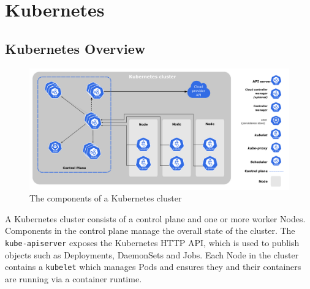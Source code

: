 \section{Kubernetes}

\subsection{Kubernetes Overview}

\begin{figure}[ht]
    \centering
    \includegraphics[width=\textwidth]{images/components-of-kubernetes.pdf}
    \caption{The components of a Kubernetes cluster~\cite{kubernetes-components}}
    \label{kube-components}
\end{figure}

A Kubernetes cluster consists of a control plane and one or more worker Nodes.
Components in the control plane manage the overall state of the cluster. The
\verb|kube-apiserver| exposes the Kubernetes HTTP API, which is used to publish
objects such as Deployments, DaemonSets and Jobs. Each
Node in the cluster contains a \verb|kubelet| which manages Pods and ensures
they and their containers are running via a container runtime.

